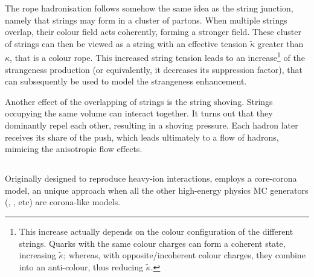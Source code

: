 The rope hadronisation follows somehow the same idea as the string junction, namely that strings may form in a cluster of partons. When multiple strings overlap, their colour field acts coherently, forming a stronger field. These cluster of strings can then be viewed as a string with an effective tension $\tilde{\kappa}$ greater than $\kappa$, that is a colour rope. This increased string tension leads to an increase\footnote{This increase actually depends on the colour configuration of the different strings. Quarks with the same colour charges can form a coherent state, increasing $\tilde{\kappa}$; whereas, with opposite/incoherent colour charges, they combine into an anti-colour, thus reducing $\tilde{\kappa}$.} of the strangeness production (or equivalently, it decreases its suppression factor), that can subsequently be used to model the strangeness enhancement.

Another effect of the overlapping of strings is the string shoving. Strings occupying the same volume can interact together. It turns out that they dominantly repel each other, resulting in a shoving pressure. Each hadron later receives its share of the push, which leads ultimately to a flow of hadrons, mimicing the anisotropic flow effects.

\subsection{\Epos}

Originally designed to reproduce heavy-ion interactions, \Epos employs a core-corona model, an unique approach when all the other high-energy physics MC generators (\Pythia, \Herwig, etc) are corona-like models. 

